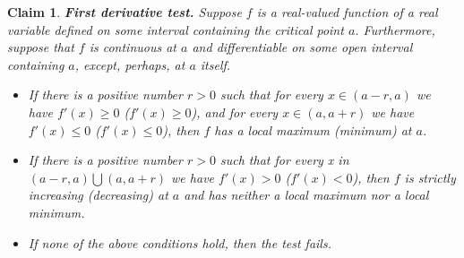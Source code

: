 \documentclass[11pt]{book}
\newtheorem{clm}[thm]{Claim}
\begin{document}
\begin{clm}\textbf{First derivative test. }Suppose $f$ is a real-valued function
of a real variable defined on some interval containing the critical
point $a$. Furthermore, suppose that $f$ is continuous at $a$ and differentiable
on some open interval containing $a$, except, perhaps, at $a$ itself.
\begin{itemize}
\item If there is a positive number $r>0$ such that for every $x\in\left(a-r,a\right)$
we have $f'\left(x\right)\geq0$ ($f'\left(x\right)\geq0$), and for
every $x\in\left(a,a+r\right)$ we have $f'\left(x\right)\leq0$ ($f'\left(x\right)\leq0$),
then $f$ has a local maximum (minimum) at $a$.
\item If there is a positive number $r>0$ such that for
every x in $\left(a-r,a\right)\bigcup\left(a,a+r\right)$ we have
$f'\left(x\right)>0$ ($f'\left(x\right)<0$), then $f$ is strictly
increasing (decreasing) at $a$ and has neither a local maximum nor
a local minimum.
\item If none of the above conditions hold, then the test fails.
\end{itemize}
\label{first_derivative_test}
\end{clm}
\end{document}
